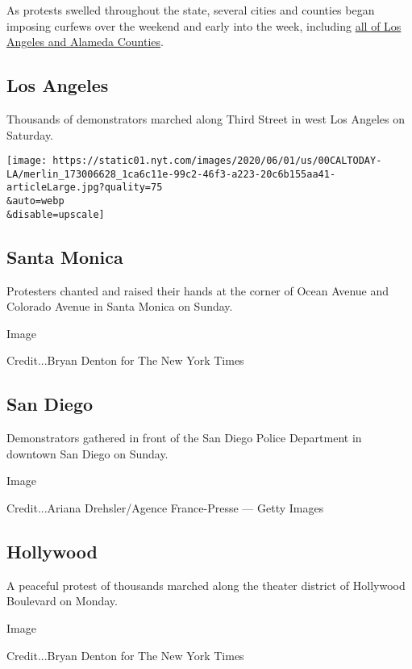 As protests swelled throughout the state, several cities and counties
began imposing curfews over the weekend and early into the week,
including
\href{https://www.latimes.com/california/story/2020-06-01/what-time-are-curfews-l-a-county-southern-california}{all
of Los Angeles and Alameda Counties}.

\hypertarget{los-angeles}{%
\subsection{Los Angeles}\label{los-angeles}}

Thousands of demonstrators marched along Third Street in west Los
Angeles on Saturday.

\texttt{[image: https://static01.nyt.com/images/2020/06/01/us/00CALTODAY-LA/merlin\_173006628\_1ca6c11e-99c2-46f3-a223-20c6b155aa41-articleLarge.jpg?quality=75\\\&auto=webp\\\&disable=upscale]}

\hypertarget{santa-monica}{%
\subsection{Santa Monica}\label{santa-monica}}

Protesters chanted and raised their hands at the corner of Ocean Avenue
and Colorado Avenue in Santa Monica on Sunday.

Image

Credit...Bryan Denton for The New York Times

\hypertarget{san-diego}{%
\subsection{San Diego}\label{san-diego}}

Demonstrators gathered in front of the San Diego Police Department in
downtown San Diego on Sunday.

Image

Credit...Ariana Drehsler/Agence France-Presse --- Getty Images

\hypertarget{hollywood}{%
\subsection{Hollywood}\label{hollywood}}

A peaceful protest of thousands marched along the theater district of
Hollywood Boulevard on Monday.

Image

Credit...Bryan Denton for The New York Times

